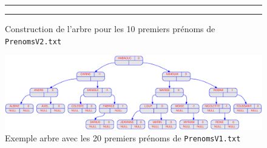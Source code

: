 \documentclass{article} %
\begin{document}
\begin{figure}[p]
\begin{center}
     \rule{\linewidth}{.5pt} %
     \vline
      \rule{\linewidth}{.5pt} %
   
    
  \end{center}
  
  \caption{Construction de l'arbre pour les 10 premiers prénoms de \texttt{PrenomsV2.txt}}
  \label{fig:prog1_1}
\end{figure}

\begin{figure}[p]
  \begin{center}
    \includegraphics[scale=0.36]{Img_prog1/displayAVL_20.eps}
  \end{center}
  \caption{Exemple arbre avec les 20 premiers prénoms de \texttt{PrenomsV1.txt}}
  \label{fig:prog1_2}
\end{figure}
\end{document}
